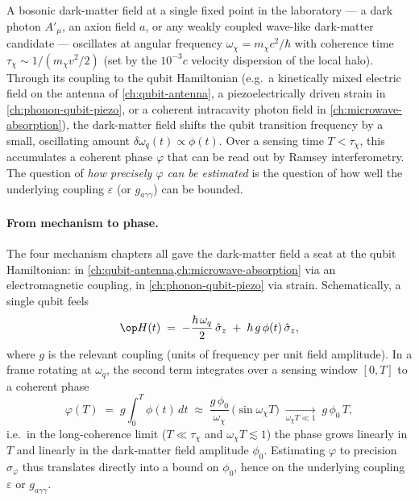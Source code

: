 \begin{phenomenon}
A bosonic dark-matter field at a single fixed point in the
laboratory --- a dark photon $A'_\mu$, an axion field $a$, or
any weakly coupled wave-like dark-matter candidate ---
oscillates at angular frequency $\omega_\chi=m_\chi c^2/\hbar$
with coherence time $\tau_\chi\sim 1/(m_\chi v^2/2)$ (set by the
$10^{-3}c$ velocity dispersion of the local halo). Through its
coupling to the qubit Hamiltonian (e.g.\ a kinetically mixed
electric field on the antenna of \cref{ch:qubit-antenna}, a
piezoelectrically driven strain in
\cref{ch:phonon-qubit-piezo}, or a coherent intracavity photon
field in \cref{ch:microwave-absorption}), the dark-matter
field shifts the qubit transition frequency by a small,
oscillating amount $\delta\omega_q(t)\propto\phi(t)$. Over a
sensing time $T<\tau_\chi$, this accumulates a coherent
phase $\varphi$ that can be read out by Ramsey
interferometry. The question of \emph{how precisely
$\varphi$ can be estimated} is the question of how well the
underlying coupling $\varepsilon$ (or $g_{a\gamma\gamma}$) can
be bounded.
\end{phenomenon}

\paragraph{From mechanism to phase.}
The four mechanism chapters all gave the dark-matter field a
seat at the qubit Hamiltonian: in
\cref{ch:qubit-antenna,ch:microwave-absorption} via an
electromagnetic coupling, in \cref{ch:phonon-qubit-piezo} via
strain. Schematically, a single qubit feels
\begin{equation}
\label{eq:dm-phase-hamiltonian}
\op H(t) \;=\; -\frac{\hbar\,\omega_q}{2}\,\hat\sigma_z
\;+\; \hbar\,g\,\phi(t)\,\hat\sigma_z,
\end{equation}
where $g$ is the relevant coupling (units of frequency per unit
field amplitude). In a frame rotating at $\omega_q$, the second
term integrates over a sensing window $[0,T]$ to a coherent
phase
\begin{equation}
\label{eq:dm-phase-integral}
\varphi(T) \;=\; g \int_0^T\! \phi(t)\,dt \;\approx\;
\frac{g\,\phi_0}{\omega_\chi}\,
\bigl(\sin\omega_\chi T\bigr)
\;\xrightarrow[\omega_\chi T\ll 1]{}\;
g\,\phi_0\,T,
\end{equation}
i.e.\ in the long-coherence limit ($T\ll\tau_\chi$ and
$\omega_\chi T\lesssim 1$) the phase grows linearly in $T$ and
linearly in the dark-matter field amplitude $\phi_0$. Estimating
$\varphi$ to precision $\sigma_\varphi$ thus translates directly
into a bound on $\phi_0$, hence on the underlying coupling
$\varepsilon$ or $g_{a\gamma\gamma}$.

